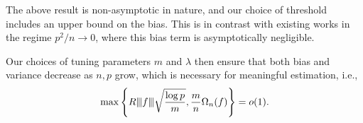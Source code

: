 The above result is non-asymptotic in nature, and our choice of threshold includes an upper bound on the bias. This is in contrast with existing works in the regime $p^2/n \rightarrow 0$, where this bias term is asymptotically negligible. 
\iffalse
In the double-asymptotic analysis of \citep{bohm2009shrinkage} as well, the  authors claim the bias of the estimator i.e., $|\mathbb{E}\hat{f}(\omega_j)-f(\omega)| = o(\frac{m}{n})$ which is negligible. In our work, we explicitly derive an upper bound for this bias term as
\begin{equation}
\left|\mathbb{E}\hat{f}_{rs}(\omega_j)-f_{rs}(\omega)\right| \le \frac{m+1/2\pi}{n}\Omega_n(f)+\frac{1}{2\pi}L_n(f)   \nonumber
\end{equation}
for any $1\le r,s\le p$. 
\fi
Our choices of tuning parameters $m$ and $\lambda$ then ensure that both bias and variance decrease as $n,p$ grow, which is necessary for meaningful estimation, i.e.,   
\begin{equation}
\label{eq:var_bias_zero}
\max\left\{R{\left\vert\kern-0.25ex\left\vert\kern-0.25ex\left\vert f \right\vert\kern-0.25ex\right\vert\kern-0.25ex\right\vert}\sqrt{\frac{\log p}{m}}, \frac{m}{n}\Omega_n(f)\right\} = o(1).
\end{equation}


